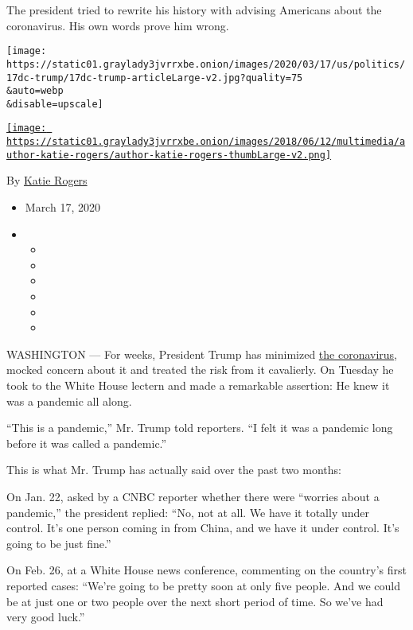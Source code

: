 The president tried to rewrite his history with advising Americans about
the coronavirus. His own words prove him wrong.

\texttt{[image: https://static01.graylady3jvrrxbe.onion/images/2020/03/17/us/politics/17dc-trump/17dc-trump-articleLarge-v2.jpg?quality=75\\\&auto=webp\\\&disable=upscale]}

\href{https://www.nytimes3xbfgragh.onion/by/katie-rogers}{\texttt{[image: https://static01.graylady3jvrrxbe.onion/images/2018/06/12/multimedia/author-katie-rogers/author-katie-rogers-thumbLarge-v2.png]}}

By \href{https://www.nytimes3xbfgragh.onion/by/katie-rogers}{Katie
Rogers}

\begin{itemize}
\item
  March 17, 2020
\item
  \begin{itemize}
  \item
  \item
  \item
  \item
  \item
  \item
  \end{itemize}
\end{itemize}

WASHINGTON --- For weeks, President Trump has minimized
\href{https://www.nytimes3xbfgragh.onion/2020/03/17/world/coronavirus-update-latest-news.html}{the
coronavirus}, mocked concern about it and treated the risk from it
cavalierly. On Tuesday he took to the White House lectern and made a
remarkable assertion: He knew it was a pandemic all along.

``This is a pandemic,'' Mr. Trump told reporters. ``I felt it was a
pandemic long before it was called a pandemic.''

This is what Mr. Trump has actually said over the past two months:

On Jan. 22, asked by a CNBC reporter whether there were ``worries about
a pandemic,'' the president replied: ``No, not at all. We have it
totally under control. It's one person coming in from China, and we have
it under control. It's going to be just fine.''

On Feb. 26, at a White House news conference, commenting on the
country's first reported cases: ``We're going to be pretty soon at only
five people. And we could be at just one or two people over the next
short period of time. So we've had very good luck.''


